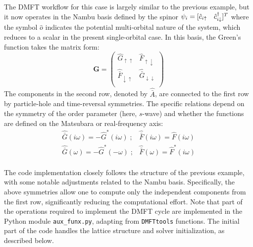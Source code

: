\documentclass[edipack_sp.tex]{subfiles}
\begin{document}
The DMFT workflow for this case is largely similar to the previous 
example, but it now operates in the Nambu basis defined by the spinor $\psi_i=[\hat{c}_{i\uparrow}\quad  \hat{c}^\dagger_{i\downarrow}]^T$ where the symbol $\hat{o}$ indicates the potential multi-orbital nature of the system, which reduces to a scalar in the present single-orbital case.
In this basis, the Green's function takes the matrix form:
\begin{equation}
  {\mathbf G} =
  \begin{pmatrix}
    \hat{G}_{\uparrow\uparrow} & \hat{F}_{\uparrow\downarrow}\\
    \hat{\bar{F}}_{\downarrow\uparrow}  &    \hat{\bar{G}}_{\downarrow\downarrow} \\
  \end{pmatrix}
\end{equation}
The components in the second row, denoted 
by $\hat{\bar{A}}$, are connected to the first row by particle-hole and time-reversal symmetries. The specific relations depend on the 
symmetry of the order parameter (here, $s$-wave) and whether the 
functions are defined on the Matsubara or real-frequency axis:
\begin{equation}
\begin{array}{cc}
  \hat{\bar{G}}(i\omega) = -\hat{G}^*(i\omega)\;; &  \hat{\bar{F}}(i\omega) = \hat{F}(i\omega)\\
  \hat{\bar{G}}(\omega)  = -\hat{G}^*(-\omega) \;; & \hat{\bar{F}}(\omega) = \hat{F}^*(i\omega)\\
\end{array}
\end{equation}  

The code implementation closely follows the structure of the previous 
example, with some notable adjustments related to the Nambu basis. 
Specifically, the above symmetries allow one to compute only the 
independent components from the first row, significantly reducing 
the computational effort. 
Note that part of the operations required to implement the DMFT cycle are implemented in the Python module {\tt aux\_funx.py}, adapting from {\tt DMFTtools} functions.  
The initial part of the code handles the 
lattice structure and solver initialization, as described below.
\end{document}
